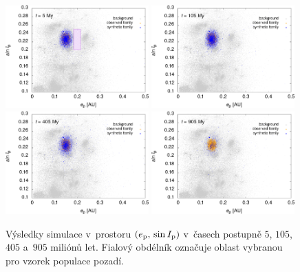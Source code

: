 \documentclass[A4paper, 12pt, oneside, openany]{book}
\begin{document}
\immediate{}
\immediate{}
\immediate{}
\immediate{}
\begin{figure}[t]
	\centering
	\includegraphics[width=0.49\textwidth]{obr/ei_5t.png}
	\includegraphics[width=0.49\textwidth]{obr/ei_105t.png}\\
	\includegraphics[width=0.49\textwidth]{obr/ei_405t.png}
	\includegraphics[width=0.49\textwidth]{obr/ei_905t.png}
	\caption{Výsledky simulace v~prostoru $(e_{\rm p},\,\sin I_{\rm p})$ v~časech postupně $5$, $105$, $405$ a~$905$ miliónů let. Fialový obdélník označuje oblast vybranou pro vzorek populace pozadí.} \label{fig:ei_sim}
\end{figure}
\end{document}
